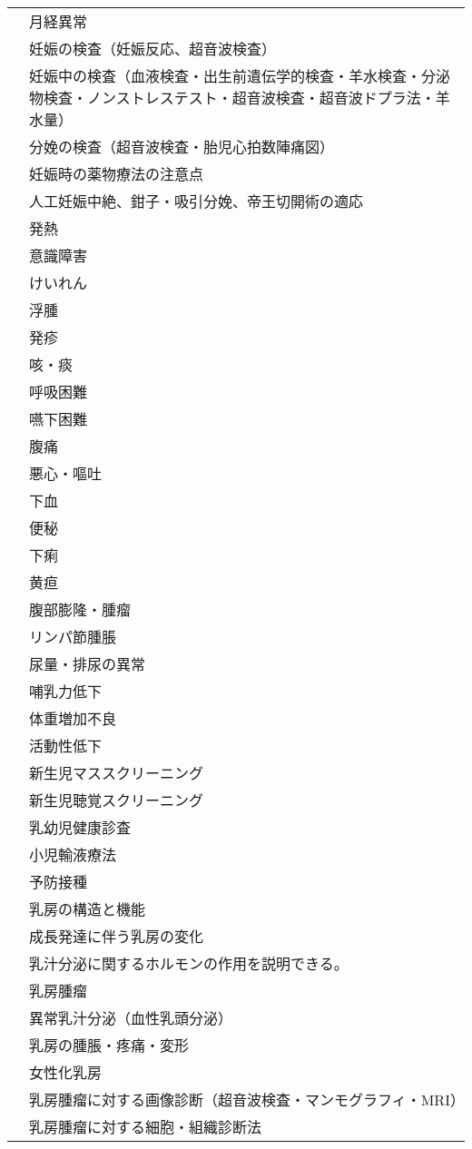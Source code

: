 \begin{xltabular}{\linewidth}{XX}
 & 月経異常 \\
 & 妊娠の検査（妊娠反応、超音波検査） \\
 & 妊娠中の検査（血液検査・出生前遺伝学的検査・羊水検査・分泌物検査・ノンストレステスト・超音波検査・超音波ドプラ法・羊水量） \\
 & 分娩の検査（超音波検査・胎児心拍数陣痛図） \\
 & 妊娠時の薬物療法の注意点 \\
 & 人工妊娠中絶、鉗子・吸引分娩、帝王切開術の適応 \\
 & 発熱 \\
 & 意識障害 \\
 & けいれん \\
 & 浮腫 \\
 & 発疹 \\
 & 咳・痰 \\
 & 呼吸困難 \\
 & 嚥下困難 \\
 & 腹痛 \\
 & 悪心・嘔吐 \\
 & 下血 \\
 & 便秘 \\
 & 下痢 \\
 & 黄疸 \\
 & 腹部膨隆・腫瘤 \\
 & リンパ節腫脹 \\
 & 尿量・排尿の異常 \\
 & 哺乳力低下 \\
 & 体重増加不良 \\
 & 活動性低下 \\
 & 新生児マススクリーニング \\
 & 新生児聴覚スクリーニング \\
 & 乳幼児健康診査 \\
 & 小児輸液療法 \\
 & 予防接種 \\
 & 乳房の構造と機能 \\
 & 成長発達に伴う乳房の変化 \\
 & 乳汁分泌に関するホルモンの作用を説明できる。 \\
 & 乳房腫瘤 \\
 & 異常乳汁分泌（血性乳頭分泌） \\
 & 乳房の腫脹・疼痛・変形 \\
 & 女性化乳房 \\
 & 乳房腫瘤に対する画像診断（超音波検査・マンモグラフィ・MRI） \\
 & 乳房腫瘤に対する細胞・組織診断法 \\

\end{xltabular}
